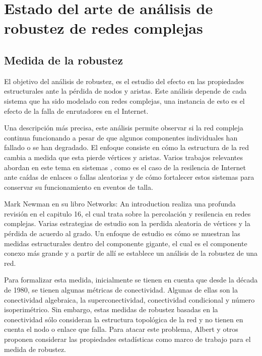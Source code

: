 \section{Estado del arte de análisis de robustez de redes complejas}

\subsection{Medida de la robustez}

El objetivo del análisis de robustez, es el estudio del efecto en las propiedades estructurales ante la pérdida de nodos y aristas\cite{Albert2000}. Este análisis depende de cada sistema que ha sido modelado con redes complejas, una instancia de esto es el efecto de la falla de enrutadores en el Internet.

Una descripción más precisa, este análisis permite observar si la red compleja continua funcionando a pesar de que algunos componentes individuales han fallado o se han degradado. El enfoque consiste en cómo la estructura de la red cambia a medida que esta pierde vértices y aristas. Varios trabajos relevantes abordan en este tema en sistemas , como es el caso de la resilencia de Internet ante caídas de enlaces o fallas aleatorias\cite{Cohen2000} y de cómo fortalecer estos sistemas para conservar su funcionamiento en eventos de talla\cite{Cohen2003}.

Mark Newman en su libro Networks: An introduction\cite{Newman2010} realiza una profunda revisión en el capitulo 16, el cual trata sobre la percolación y resilencia en redes complejas. Varias estrategias de estudio son la perdida aleatoria de vértices y la pérdida de acuerdo al grado. Un enfoque de estudio es cómo se muestran las medidas estructurales dentro del componente gigante, el cual es el componente conexo más grande y a partir de allí se establece un análisis de la robustez de una red.

Para formalizar esta medida, inicialmente se tienen en cuenta que desde la década de 1980, se tienen algunas métricas de conectividad. Algunas de ellas son la conectividad algebraica\cite{Fiedler1973}, la superconectividad\cite{Bauer1985}, conectividad condicional\cite{Harary1983} y número isoperimétrico\cite{Mohar1989}. Sin embargo, estas medidas de robustez basadas en la conectividad sólo consideran la estructura topológica de la red y no tienen en cuenta el nodo o enlace que falla. Para atacar este problema, Albert y otros\cite{Albert2000} proponen considerar las propiedades estadísticas como marco de trabajo para el medida de robustez. 

